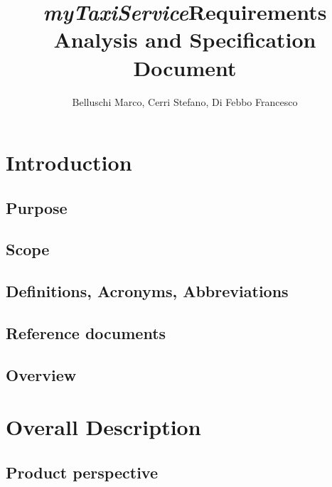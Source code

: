 \documentclass[]{report}
\title{{\Huge \emph{myTaxiService}}\linebreak Requirements Analysis and Specification Document}
\author{Belluschi Marco, Cerri Stefano, Di Febbo Francesco}
\begin{document}
\maketitle
\tableofcontents

\chapter{Introduction}

\section{Purpose}


\section{Scope}


%
%
%

\section{Definitions, Acronyms, Abbreviations}


\section{Reference documents}


\section{Overview}



\chapter{Overall Description}

\section{Product perspective}

\end{document}
